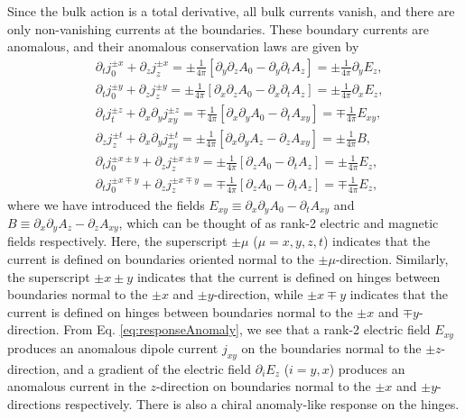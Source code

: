 \documentclass[prb,aps,twocolumn,groupaddress,floatfix]{revtex4-1}
\begin{document}
Since the bulk action is a total derivative, all bulk currents vanish, and there are only non-vanishing currents at the boundaries. These boundary currents are anomalous, and their anomalous conservation laws are given by
\begin{equation}
\begin{split}
&\partial_t j^{\pm x}_0 + \partial_z j^{\pm x}_z = \pm \frac{1}{4\pi} [\partial_y \partial_z A_0 - \partial_y\partial_t A_z]= \pm \frac{1}{4\pi} \partial_y E_z,\\
&\partial_t j^{\pm y}_0 + \partial_z j^{\pm y}_z = \pm \frac{1}{4\pi} [\partial_x \partial_z A_0 - \partial_x\partial_t A_z]= \pm \frac{1}{4\pi} \partial_x E_z,\\
&\partial_t j^{\pm z}_t + \partial_x \partial_y  j^{\pm z}_{xy} =\mp \frac{1}{4\pi} [\partial_x \partial_y A_0 - \partial_t A_{xy}] =\mp \frac{1}{4\pi} E_{xy},\\
&\partial_z j^{\pm t}_z + \partial_x \partial_y  j^{\pm t}_{xy} =\pm \frac{1}{4\pi} [\partial_x \partial_y A_z - \partial_z A_{xy}]= \pm \frac{1}{4\pi} B,\\
&\partial_t j^{\pm x\pm y}_0 + \partial_z j^{\pm x \pm y}_{z} = \pm \frac{1}{4\pi}[\partial_z A_0 - \partial_t A_z]= \pm \frac{1}{4\pi} E_z,\\
&\partial_t j^{\pm x\mp y}_0 + \partial_z j^{\pm x \mp y}_{z} = \mp \frac{1}{4\pi}[\partial_z A_0 - \partial_t A_z]= \mp \frac{1}{4\pi} E_z,
\end{split}\label{eq:responseAnomaly}
\end{equation}
where we have introduced the fields $E_{xy} \equiv \partial_x \partial_y A_0 - \partial_t A_{xy}$ and $B \equiv \partial_x \partial_y A_z - \partial_z A_{xy}$, which can be thought of as rank-2 electric and magnetic fields respectively. Here, the superscript $\pm \mu$ ($\mu = x,y,z,t$) indicates that the current is defined on boundaries oriented normal to the $\pm\mu$-direction. Similarly, the superscript $\pm x \pm y$ indicates that the current is defined on hinges between boundaries normal to the $\pm x$ and $\pm y$-direction, while $\pm x \mp  y$ indicates that the current is defined on hinges between boundaries normal to the $\pm x$ and $\mp y$-direction. From Eq. \ref{eq:responseAnomaly}, we see that a rank-2 electric field $E_{xy}$ produces an anomalous dipole current $j_{xy}$ on the boundaries normal to the $\pm z$-direction, and a gradient of the electric field $\partial_i E_z$ ($i=y, x$) produces an anomalous current in the $z$-direction on boundaries normal to the $\pm x$ and $\pm y$-directions respectively. There is also a chiral anomaly-like response on the hinges.
\end{document}

